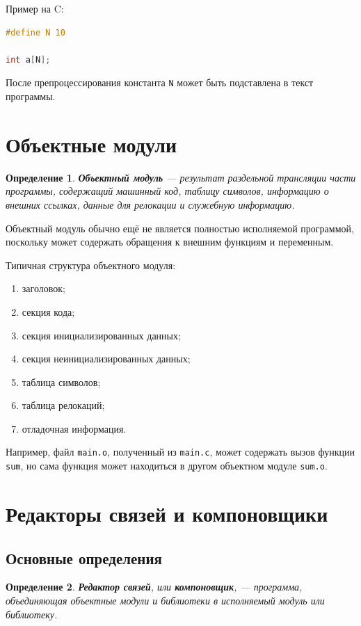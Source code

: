 \documentclass[12pt,a4paper]{article}
\newtheorem{definition}{Определение}
\begin{document}
Пример на C:

\begin{lstlisting}[language=C]
#define N 10

int a[N];
\end{lstlisting}

После препроцессирования константа \texttt{N} может быть подставлена в текст программы.

\section{Объектные модули}

\begin{definition}
\textbf{Объектный модуль} --- результат раздельной трансляции части программы, содержащий машинный код, таблицу символов, информацию о внешних ссылках, данные для релокации и служебную информацию.
\end{definition}

Объектный модуль обычно ещё не является полностью исполняемой программой, поскольку может содержать обращения к внешним функциям и переменным.

Типичная структура объектного модуля:
\begin{enumerate}
  \item заголовок;
  \item секция кода;
  \item секция инициализированных данных;
  \item секция неинициализированных данных;
  \item таблица символов;
  \item таблица релокаций;
  \item отладочная информация.
\end{enumerate}

Например, файл \texttt{main.o}, полученный из \texttt{main.c}, может содержать вызов функции \texttt{sum}, но сама функция может находиться в другом объектном модуле \texttt{sum.o}.

\section{Редакторы связей и компоновщики}

\subsection{Основные определения}

\begin{definition}
\textbf{Редактор связей}, или \textbf{компоновщик}, --- программа, объединяющая объектные модули и библиотеки в исполняемый модуль или библиотеку.
\end{definition}
\end{document}
